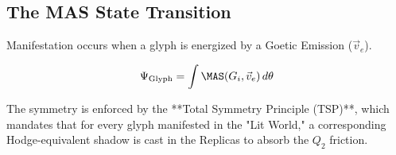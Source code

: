 \documentclass[11pt, letterpaper]{article}
\begin{document}
\subsection{The MAS State Transition}\label{sec:17.2}
Manifestation occurs when a glyph is energized by a Goetic Emission ($\vec{v}_e$).

\[ \Psi_{\text{Glyph}} = \int \MAS(G_i, \vec{v}_e) \, d\theta \]

The symmetry is enforced by the **Total Symmetry Principle (TSP)**, which mandates that for every glyph manifested in the "Lit World," a corresponding Hodge-equivalent shadow is cast in the Replicas to absorb the $Q_2$ friction.
\end{document}
